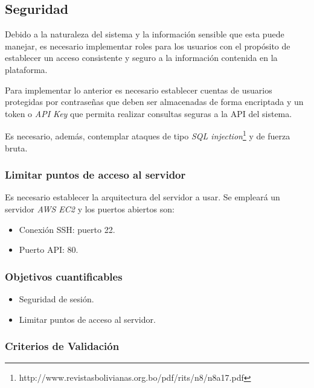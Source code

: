 \subsection{Seguridad}

Debido a la naturaleza del sistema y la información sensible que esta puede manejar, es necesario implementar roles para los usuarios con el propósito de establecer un acceso consistente y seguro a la información contenida en la plataforma. 

Para implementar lo anterior es necesario establecer cuentas de usuarios protegidas por contraseñas que deben ser almacenadas de forma encriptada y un token o \emph{API Key} que permita realizar consultas seguras a la API del sistema.

Es necesario, además, contemplar ataques de tipo \emph{SQL injection}\footnote{http://www.revistasbolivianas.org.bo/pdf/rits/n8/n8a17.pdf}  y de fuerza bruta.


\subsubsection{Limitar puntos de acceso al servidor}

Es necesario establecer la arquitectura del servidor a usar. Se empleará un servidor \emph{AWS EC2} y los puertos abiertos son: 
\begin{itemize}
	\item
	Conexión SSH: puerto 22.
	\item
	Puerto API: 80.
\end{itemize}

\subsubsection{Objetivos cuantificables}

\begin{itemize}
	\item
	Seguridad de sesión.
	\item
	Limitar puntos de acceso al servidor.
\end{itemize}

\subsubsection{Criterios de Validación}

